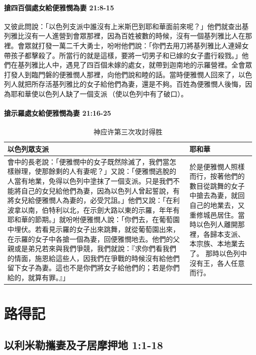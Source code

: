 \subsubsection{搶四百個處女給便雅憫為妻 21:8-15}
又彼此問說：「以色列支派中誰沒有上米斯巴到耶和華面前來呢？」他們就查出基列雅比沒有一人進營到會眾那裡，因為百姓被數的時候，沒有一個基列雅比人在那裡。會眾就打發一萬二千大勇士，吩咐他們說：「你們去用刀將基列雅比人連婦女帶孩子都擊殺了。所當行的就是這樣，要將一切男子和已嫁的女子盡行殺戮。」他們在基列雅比人中，遇見了四百個未嫁的處女，就帶到迦南地的示羅營裡。全會眾打發人到臨門磐的便雅憫人那裡，向他們說和睦的話。當時便雅憫人回來了，以色列人就把所存活基列雅比的女子給他們為妻，還是不夠。百姓為便雅憫人後悔，因為耶和華使以色列人缺了一個支派 （使以色列中有了破口）。

\subsubsection{搶示羅處女給便雅憫為妻 21:16-25}
\begin{table}[H]
\centering
\begin{tabular}{p{}|p{4cm}}\hline
以色列眾支派&耶和華\\\hline
會中的長老說：「便雅憫中的女子既然除滅了，我們當怎樣辦理，使那餘剩的人有妻呢？」又說：「便雅憫逃脫的人當有地業，免得以色列中塗抹了一個支派。只是我們不能將自己的女兒給他們為妻，因為以色列人曾起誓說，有將女兒給便雅憫人為妻的，必受咒詛。」他們又說：「在利波拿以南，伯特利以北，在示劍大路以東的示羅，年年有耶和華的節期。」就吩咐便雅憫人說：「你們去，在葡萄園中埋伏。若看見示羅的女子出來跳舞，就從葡萄園出來，在示羅的女子中各搶一個為妻，回便雅憫地去。他們的父親或是弟兄若來與我們爭競，我們就說：『求你們看我們的情面，施恩給這些人，因我們在爭戰的時候沒有給他們留下女子為妻。這也不是你們將女子給他們的；若是你們給的，就算有罪。』」
&於是便雅憫人照樣而行，按著他們的數目從跳舞的女子中搶去為妻，就回自己的地業去，又重修城邑居住。當時以色列人離開那裡，各歸本支派、本宗族、本地業去了。
那時以色列中沒有王，各人任意而行。\\\hline
\end{tabular}
\caption{神应许第三次攻討得胜}
\end{table}  




\chapter{路得記}
\section{以利米勒攜妻及子居摩押地 1:1-18}
